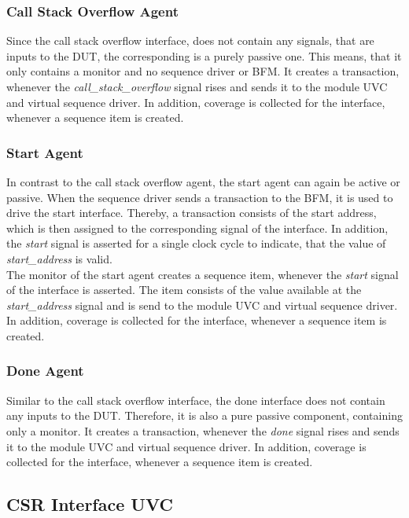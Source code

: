 \subsubsection{Call Stack Overflow Agent}

Since the call stack overflow interface, does not contain any signals, that are inputs to the DUT, the corresponding is a purely passive one.
This means, that it only contains a monitor and no sequence driver or BFM.
It creates a transaction, whenever the \emph{call\_stack\_overflow} signal rises and sends it to the module UVC and virtual sequence driver.
In addition, coverage is collected for the interface, whenever a sequence item is created.

\subsubsection{Start Agent}

In contrast to the call stack overflow agent, the start agent can again be active or passive.
When the sequence driver sends a transaction to the BFM, it is used to drive the start interface.
Thereby, a transaction consists of the start address, which is then assigned to the corresponding signal of the interface.
In addition, the \emph{start} signal is asserted for a single clock cycle to indicate, that the value of \emph{start\_address} is valid.\\
The monitor of the start agent creates a sequence item, whenever the \emph{start} signal of the interface is asserted.
The item consists of the value available at the \emph{start\_address} signal and is send to the module UVC and virtual sequence driver.
In addition, coverage is collected for the interface, whenever a sequence item is created.

\subsubsection{Done Agent}

Similar to the call stack overflow interface, the done interface does not contain any inputs to the DUT.
Therefore, it is also a pure passive component, containing only a monitor.
It creates a transaction, whenever the \emph{done} signal rises and sends it to the module UVC and virtual sequence driver.
In addition, coverage is collected for the interface, whenever a sequence item is created.

\subsection{CSR Interface UVC}


